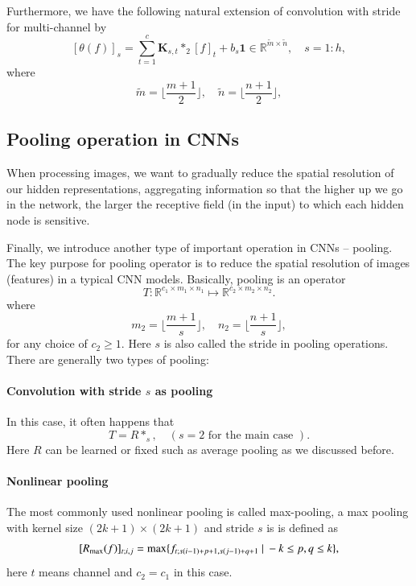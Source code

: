 Furthermore, we have the following natural extension of convolution with
stride for multi-channel by 
\begin{equation}\label{conv-1}
[\theta(f)]_{s} = \sum_{t=1}^{c}\mathbf{K}_{s,t} \ast_2 [f]_t + b_s
\bm{1}  \in \mathbb{R}^{\tilde m \times \tilde n}, \quad s = 1:h,
\end{equation}
where
\begin{equation}\label{key}
\tilde m = \lfloor \frac{m+1}{2}\rfloor , \quad \tilde n = \lfloor \frac{n+1}{2} \rfloor, 
\end{equation}






\subsection{Pooling operation in CNNs}
When processing images, we want to  gradually reduce the spatial resolution of our hidden representations, aggregating information so that the higher up we go in the network, the larger the receptive field (in the input) to which each hidden node is sensitive.

Finally, we introduce another type of important operation in CNNs -- pooling.
The key purpose for pooling operator is to reduce the spatial resolution of images (features) in a typical CNN models.
Basically, pooling is an operator
\begin{equation}\label{key}
T: \mathbb{R}^{c_1\times m_1\times n_1} \mapsto \mathbb{R}^{c_2 \times m_2\times n_2}.
\end{equation}
where 
\begin{equation}\label{key}
m_2 = \lfloor \frac{m+1}{s}\rfloor , \quad n_2 = \lfloor \frac{n+1}{s} \rfloor, 
\end{equation}
for any choice of $c_2 \ge 1$. Here $s$ is also called the stride in pooling operations. There are generally two types of pooling:

	\paragraph{Convolution with stride $s$ as pooling} In this case, it often happens that
	\begin{equation}\label{key}
	T = R \ast_s, \quad  (s = 2 \text{ for the main case }).
	\end{equation}
	Here $R$ can be learned or fixed such as average pooling as we discussed before.
	
	\paragraph{Nonlinear pooling} The most commonly used nonlinear pooling is called max-pooling, 
	a max pooling with kernel size $(2k+1)\times (2k+1)$ and stride $s$ is is defined as
	\begin{equation}\label{key}
	[R_{\rm max}(f)]_{t; i,j} = \max \{ f_{t;s(i-1) + p+1, s(j-1) + q+1} ~|~ -k \le p,q \le k\},
	\end{equation}
	here $t$ means channel and $c_2 = c_1$ in this case.

